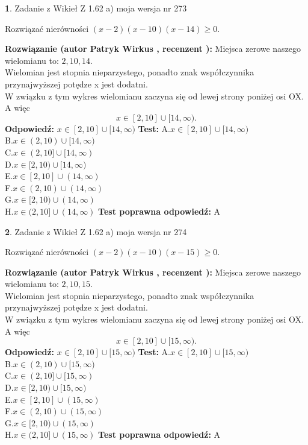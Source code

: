 \documentclass[12pt, a4paper]{article}
\theoremstyle{definition} %
\newtheorem{zad}{}
\newcommand{\zadStart}[1]{\begin{zad}#1\newline}
\newcommand{\zadStop}{\end{zad}}
\newcommand{\rozwStart}[2]{\noindent \textbf{Rozwiązanie (autor #1 , recenzent #2): }\newline}
\newcommand{\rozwStop}{\newline}
\newcommand{\odpStart}{\noindent \textbf{Odpowiedź:}\newline}
\newcommand{\odpStop}{\newline}
\newcommand{\testStart}{\noindent \textbf{Test:}\newline}
\newcommand{\testStop}{\newline}
\newcommand{\kluczStart}{\noindent \textbf{Test poprawna odpowiedź:}\newline}
\newcommand{\kluczStop}{\newline}
\begin{document}
\zadStart{Zadanie z Wikieł Z 1.62 a) moja wersja nr 273}

Rozwiązać nierówności $(x-2)(x-10)(x-14)\ge0$.
\zadStop
\rozwStart{Patryk Wirkus}{}
Miejsca zerowe naszego wielomianu to: $2, 10, 14$.\\
Wielomian jest stopnia nieparzystego, ponadto znak współczynnika przy\linebreak najwyższej potędze x jest dodatni.\\ W związku z tym wykres wielomianu zaczyna się od lewej strony poniżej osi OX. A więc $$x \in [2,10] \cup [14,\infty).$$
\rozwStop
\odpStart
$x \in [2,10] \cup [14,\infty)$
\odpStop
\testStart
A.$x \in [2,10] \cup [14,\infty)$\\
B.$x \in (2,10) \cup [14,\infty)$\\
C.$x \in (2,10] \cup [14,\infty)$\\
D.$x \in [2,10) \cup [14,\infty)$\\
E.$x \in [2,10] \cup (14,\infty)$\\
F.$x \in (2,10) \cup (14,\infty)$\\
G.$x \in [2,10) \cup (14,\infty)$\\
H.$x \in (2,10] \cup (14,\infty)$
\testStop
\kluczStart
A
\kluczStop



\zadStart{Zadanie z Wikieł Z 1.62 a) moja wersja nr 274}

Rozwiązać nierówności $(x-2)(x-10)(x-15)\ge0$.
\zadStop
\rozwStart{Patryk Wirkus}{}
Miejsca zerowe naszego wielomianu to: $2, 10, 15$.\\
Wielomian jest stopnia nieparzystego, ponadto znak współczynnika przy\linebreak najwyższej potędze x jest dodatni.\\ W związku z tym wykres wielomianu zaczyna się od lewej strony poniżej osi OX. A więc $$x \in [2,10] \cup [15,\infty).$$
\rozwStop
\odpStart
$x \in [2,10] \cup [15,\infty)$
\odpStop
\testStart
A.$x \in [2,10] \cup [15,\infty)$\\
B.$x \in (2,10) \cup [15,\infty)$\\
C.$x \in (2,10] \cup [15,\infty)$\\
D.$x \in [2,10) \cup [15,\infty)$\\
E.$x \in [2,10] \cup (15,\infty)$\\
F.$x \in (2,10) \cup (15,\infty)$\\
G.$x \in [2,10) \cup (15,\infty)$\\
H.$x \in (2,10] \cup (15,\infty)$
\testStop
\kluczStart
A
\kluczStop
\end{document}
